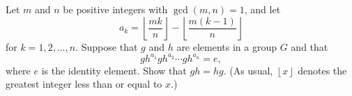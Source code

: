Let $m$ and $n$ be positive integers with $\gcd\left(m,n\right)=1$, and let \[a_k=\left\lfloor\frac{mk}{n}\right\rfloor-\left\lfloor\frac{m\left(k-1\right)}{n}\right\rfloor\] for $k=1,2,\ldots,n$. Suppose that $g$ and $h$ are elements in a group $G$ and that \[gh^{a_1}gh^{a_2}\cdots gh^{a_n}=e,\] where $e$ is the identity element. Show that $gh=hg$. (As usual, $\left\lfloor x\right\rfloor$ denotes the greatest integer less than or equal to $x$.)
